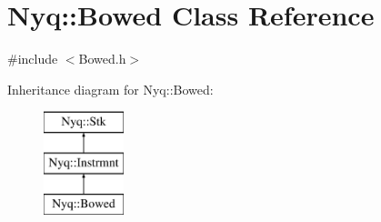 \hypertarget{class_nyq_1_1_bowed}{}\section{Nyq\+:\+:Bowed Class Reference}
\label{class_nyq_1_1_bowed}


{\ttfamily \#include $<$Bowed.\+h$>$}

Inheritance diagram for Nyq\+:\+:Bowed\+:\begin{figure}[H]
\begin{center}
\leavevmode
\includegraphics[height=3.000000cm]{class_nyq_1_1_bowed}
\end{center}
\end{figure}
